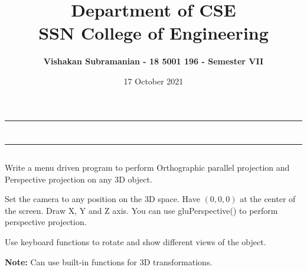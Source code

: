 \documentclass[12pt, a4]{article}
\title{\textbf{Department of CSE\\SSN College of Engineering}}
\author{\textbf{Vishakan Subramanian - 18 5001 196 - Semester VII}}
\date{17 October 2021}
\begin{document}
\maketitle
\hrule
\section*{}
\hrule
\bigskip

\subsection*{}
\subsection*{}
\begin{flushleft}

Write a menu driven program to perform Orthographic parallel projection and Perspective projection on any 3D object.
\bigskip

Set the camera to any position on the 3D space. Have $(0, 0, 0)$ at the center of the screen. Draw X, Y and Z axis. You can use gluPerspective() to perform perspective projection.

\bigskip

Use keyboard functions to rotate and show different views of the object. 

\bigskip
\textbf{Note:} Can use built-in functions for 3D transformations.
 
\end{flushleft}

\newpage
\subsection*{}
\begin{flushleft}

\end{flushleft}


\newpage
\end{document}
